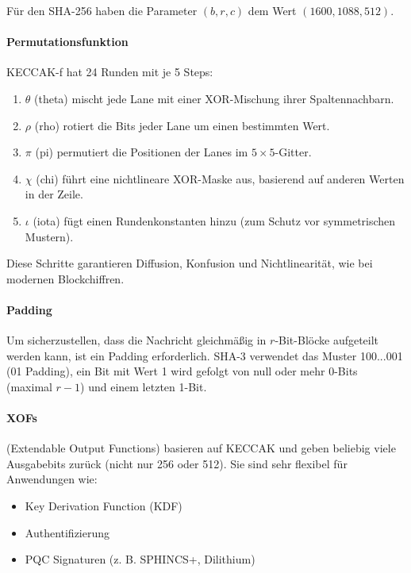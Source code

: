 Für den SHA-256 haben die Parameter $(b, r, c)$ dem Wert $(1600, 1088, 512)$.

\paragraph{Permutationsfunktion} KECCAK-f hat 24 Runden mit je 5 Steps:
\begin{enumerate}
    \item $\theta$ (theta) mischt jede Lane mit einer XOR-Mischung ihrer Spaltennachbarn.
    \item $\rho$ (rho) rotiert die Bits jeder Lane um einen bestimmten Wert.
    \item $\pi$ (pi) permutiert die Positionen der Lanes im $5\times 5$-Gitter.
    \item $\chi$ (chi) führt eine nichtlineare XOR-Maske aus, basierend auf anderen Werten in der Zeile.
    \item $\iota$ (iota) fügt einen Rundenkonstanten hinzu (zum Schutz vor symmetrischen Mustern).
\end{enumerate}

\noindent Diese Schritte garantieren Diffusion, Konfusion und Nichtlinearität, wie bei modernen
Blockchiffren.

\paragraph{Padding} Um sicherzustellen, dass die Nachricht gleichmäßig in $r$-Bit-Blöcke aufgeteilt werden
kann, ist ein Padding erforderlich. SHA-3 verwendet das Muster 100...001 (01 Padding), ein Bit mit Wert 1 wird gefolgt von null oder mehr 0-Bits (maximal $r-1$) und 
einem letzten 1-Bit.

\paragraph{XOFs} (Extendable Output Functions) basieren auf KECCAK und geben beliebig viele Ausgabebits 
zurück (nicht nur 256 oder 512).
Sie sind sehr flexibel für Anwendungen wie:
\begin{itemize}
    \item Key Derivation Function (KDF)
    \item Authentifizierung
    \item PQC Signaturen (z. B. SPHINCS+, Dilithium)
\end{itemize}

